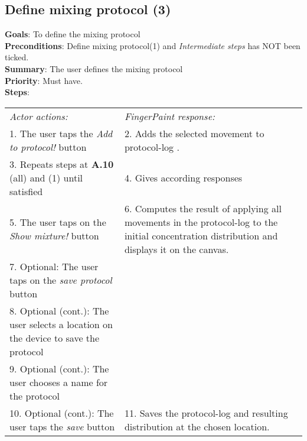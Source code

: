 \begin{appendices}
 \section{Define mixing protocol (3)}
  \textbf{Goals}: To define the mixing protocol\\
  \textbf{Preconditions}: Define mixing protocol(1) and \emph{Intermediate steps} has NOT been ticked.\\
  \textbf{Summary}: The user defines the mixing protocol\\
  \textbf{Priority}: Must have.\\
  \textbf{Steps}: \\
  \begin{tabular}{ p{} p{} }
  	\emph{Actor actions:} & \emph{FingerPaint response:} \\
    1.	The user taps the \emph{Add to protocol!} button	& 2.	Adds the selected movement to protocol-log . \\
    3.	Repeats steps at \textbf{A.10} (all) and (1) until satisfied	& 4.	Gives according responses\\
    5.	The user taps on the \emph{Show mixture!} button	& 6.	Computes the result of applying all movements in the protocol-log to the initial concentration distribution and displays it on the canvas.\\
    7.	Optional: The user taps on the \emph{save protocol} button & \\
    8. Optional (cont.): The user selects a location on the device to save the protocol & \\
    9. Optional (cont.): The user chooses a name for the protocol & \\
    10. Optional (cont.): The user taps the \emph{save} button &  11. Saves the protocol-log and resulting distribution at the chosen location. \\
  \end{tabular}
\end{appendices}
